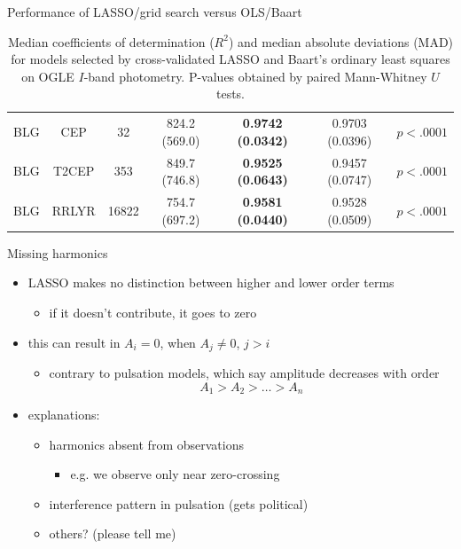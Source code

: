 \documentclass{beamer}
\begin{document}
\begin{frame}{Performance of LASSO/grid search versus OLS/Baart}
\begin{table}[ht]
\begin{tabular}{ c c c c c c c }
    BLG & CEP & 32 & 824.2 (569.0) & \textbf{ 0.9742 (0.0342)} &  0.9703 (0.0396) & $p < .0001$ \\
    BLG & T2CEP & 353 & 849.7 (746.8) & \textbf{ 0.9525 (0.0643)} &  0.9457 (0.0747) & $p < .0001$ \\
    BLG & RRLYR & 16822 & 754.7 (697.2) & \textbf{ 0.9581 (0.0440)} &  0.9528 (0.0509) & $p < .0001$ \\ \hline
  \end{tabular}
  \captionsetup{width=0.8\textwidth}
  \caption*{\tiny Median coefficients of determination ($R^2$) and median absolute deviations (MAD) for models selected by cross-validated LASSO and Baart's ordinary least squares on OGLE $I$-band photometry. P-values obtained by paired Mann-Whitney $U$ tests.}
  \end{table}
\end{frame}


\begin{frame}{Missing harmonics}
  \begin{itemize}
  \item LASSO makes no distinction between higher and lower order terms
    \begin{itemize}
    \item if it doesn't contribute, it goes to zero
    \end{itemize}
  \item this can result in $A_i = 0$, when $A_j \neq 0$, $j > i$
    \begin{itemize}
    \item contrary to pulsation models, which say amplitude decreases with order
      \begin{displaymath}
        A_1 > A_2 > \ldots > A_n
      \end{displaymath}
    \end{itemize}
  \item explanations:
    \begin{itemize}
    \item harmonics absent from observations
      \begin{itemize}
      \item e.g. we observe only near zero-crossing
      \end{itemize}
    \item interference pattern in pulsation (gets political)
    \item others? (please tell me)
    \end{itemize}
  \end{itemize}
\end{frame}
\end{document}
